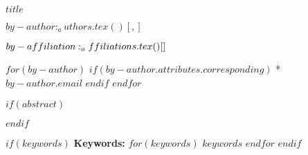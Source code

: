 

\begin{center}


\LARGE{$title$}


$by-author:_authors.tex()[, ]$\vspace{12pt}


\end{center}

$by-affiliation:_affiliations.tex()[\\ ]$

$for(by-author)$
$if(by-author.attributes.corresponding)$
* \small{$by-author.email$}
$endif$
$endfor$

\vspace{12pt}

\linenumbers

$if(abstract)$
\begin{abstract}
$abstract$
\end{abstract}
$endif$

$if(keywords)$
\small \textbf{Keywords:} $for(keywords)$ $keywords$ $endfor$ $endif$ \\


